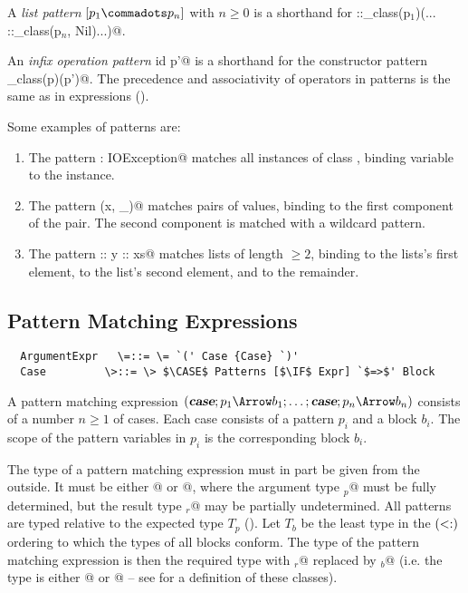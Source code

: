 \documentclass[11pt]{report}
\begin{document}
\begin{itemize}
A {\em list pattern} $[ p_1 \commadots p_n ]$ with $n \geq 0$
is a shorthand for \verb@::_class(p$_1$)(... ::_class(p$_n$, Nil)...)@.

An {\em infix operation pattern} \verb@p id p'@ is a shorthand for the
constructor pattern \verb@id_class(p)(p')@.  The precedence and
associativity of operators in patterns is the same as in expressions
().

\example Some examples of patterns are:
\begin{enumerate}
\item
The pattern \verb@ex: IOException@ matches all instances of class
\verb@IOException@, binding variable \verb@ex@ to the instance.
\item
The pattern \verb@(x, _)@ matches pairs of values, binding \verb@x@ to
the first component of the pair. The second component is matched
with a wildcard pattern.
\item
The pattern \verb@x :: y :: xs@ matches lists of length $\geq 2$,
binding \verb@x@ to the lists's first element, \verb@y@ to the list's
second element, and \verb@xs@ to the remainder.
\end{enumerate}

\subsection{Pattern Matching Expressions}
\label{sec:pattern-match}

\syntax\begin{verbatim}
  ArgumentExpr   \=::= \= `(' Case {Case} `)'
  Case	       \>::= \> $\CASE$ Patterns [$\IF$ Expr] `$=>$' Block
\end{verbatim}

A pattern matching expression $(\CASE;p_1 \Arrow b_1 ;\ldots; \CASE;p_n
\Arrow b_n)$ consists of a number $n \geq 1$ of cases.  Each case
consists of a pattern $p_i$ and a block $b_i$.  The scope
of the pattern variables in $p_i$ is the corresponding block
$b_i$.

The type of a pattern matching expression must in part be given from
the outside. It must be either \verb@Function[T$_p$, T$_r$]@ or
\verb@PartialFunction[T$_p$, T$_r$]@, where the argument type
\verb@T$_p$@ must be fully determined, but the result type \verb@T$_r$@
may be partially undetermined.  All patterns are typed relative to the
expected type $T_p$ ().  Let $T_b$ be the least
type in the $(<:)$ ordering to which the types of all blocks
conform.  The type of the pattern matching expression is then the
required type with \verb@T$_r$@ replaced by \verb@T$_b$@ (i.e. the
type is either \verb@Function[T$_p$, T$_b$]@ or
\verb@PartialFunction[T$_p$, T$_b$]@ -- see  for
a definition of these classes).


\end{itemize}
\end{document}
